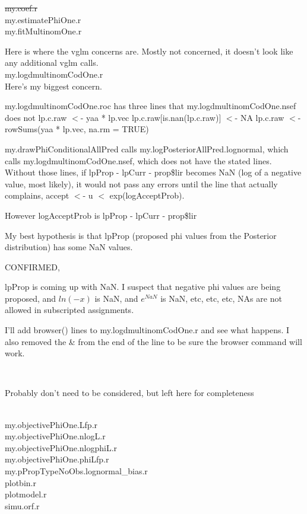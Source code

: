 \documentclass[11pt]{article} %
\begin{document}
\sout{my.coef.r}\\

my.estimatePhiOne.r\\
my.fitMultinomOne.r

Here is where the vglm concerns are. Mostly not concerned, it doesn't look like any additional vglm calls.\\


my.logdmultinomCodOne.r\\

Here's my biggest concern. 


my.logdmultinomCodOne.roc has three lines that my.logdmultinomCodOne.nsef does not
  lp.c.raw $<$- yaa * lp.vec
  lp.c.raw[is.nan(lp.c.raw)] $<$- NA
  lp.c.raw $<$- rowSums(yaa * lp.vec, na.rm = TRUE)

my.drawPhiConditionalAllPred calls my.logPosteriorAllPred.lognormal, which calls my.logdmultinomCodOne.nsef, which does not have the stated lines. Without those lines, if lpProp - lpCurr - prop\$lir becomes NaN (log of a negative value, most likely), it would not pass any errors until the line that actually complains, accept $<$- u $<$ exp(logAcceptProb).

However logAcceptProb is lpProp - lpCurr - prop\$lir

My best hypothesis is that lpProp (proposed phi values from the Posterior distribution) has some NaN values.


CONFIRMED, 



lpProp is coming up with NaN. I suspect that negative phi values are being proposed, and $ln(-x)$ is NaN, and $e^{NaN}$ is NaN, etc, etc, etc, NAs are not allowed in subscripted assignments.

I'll add browser() lines to my.logdmultinomCodOne.r and see what happens. I also removed the \& from the end of the line to be sure the browser command will work.


~


Probably don't need to be considered, but left here for completeness

~\\
my.objectivePhiOne.Lfp.r\\
my.objectivePhiOne.nlogL.r\\
my.objectivePhiOne.nlogphiL.r\\
my.objectivePhiOne.phiLfp.r\\
my.pPropTypeNoObs.lognormal\_bias.r\\
plotbin.r\\
plotmodel.r\\
simu.orf.r\\
\end{document}
